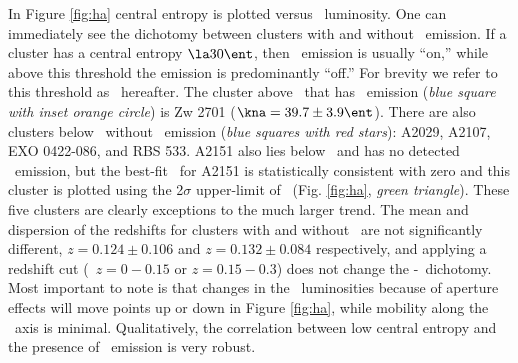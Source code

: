 In Figure \ref{fig:ha} central entropy is plotted versus
\halpha\ luminosity. One can immediately see the dichotomy between
clusters with and without \halpha\ emission. If a cluster has a
central entropy $\la 30 \ent$, then \halpha\ emission is usually
``on,'' while above this threshold the emission is predominantly
``off.'' For brevity we refer to this threshold as
\kthr\ hereafter. The cluster above \kthr\ that has \halpha\ emission
({\it{blue square with inset orange circle}}) is Zw 2701 ($\kna =
39.7 \pm 3.9 \ent$). There are also clusters below \kthr\ without
\halpha\ emission ({\it{blue squares with red stars}}): A2029, A2107, EXO
0422-086, and RBS 533. A2151 also lies below \kthr\ and has no
detected \halpha\ emission, but the best-fit \kna\ for A2151 is
statistically consistent with zero and this cluster is plotted using
the 2$\sigma$ upper-limit of \kna\ (Fig. \ref{fig:ha}, {\it{green
triangle}}). These five clusters are clearly exceptions to the much
larger trend. The mean and dispersion of the redshifts for clusters
with and without \halpha\ are not significantly different, $z = 0.124
\pm 0.106$ and $z = 0.132 \pm 0.084$ respectively, and applying a
redshift cut (\ie\ $z = 0-0.15$ or $z = 0.15-0.3$) does not change the
\kna-\halpha\ dichotomy. Most important to note is that changes in the
\halpha\ luminosities because of aperture effects will move points up
or down in Figure \ref{fig:ha}, while mobility along the \kna\ axis is
minimal. Qualitatively, the correlation between low central entropy
and the presence of \halpha\ emission is very robust.

